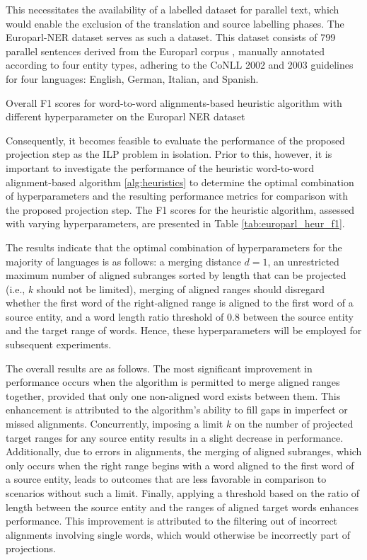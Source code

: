 This necessitates the availability of a labelled dataset for parallel text,
which would enable the exclusion of the translation and source labelling phases.
The Europarl-NER dataset \cite{agerri-etal-2018-building} serves as such a dataset.
This dataset consists of 799 parallel sentences derived from the Europarl corpus \cite{koehn2005europarl}, manually annotated according to four entity types, adhering to the CoNLL 2002 and 2003 guidelines for four languages: English, German, Italian, and Spanish.

\begin{table}[ht]
  \centering
  
  \caption{Overall F1 scores for word-to-word alignments-based heuristic
  algorithm with different hyperparameter  on the Europarl NER dataset}
  \label{tab:europarl_heur_f1}
\end{table}

Consequently, it becomes feasible to evaluate the performance of the proposed
projection step as the ILP problem in isolation. Prior to this, however, it is
important to investigate the performance of the heuristic word-to-word alignment-based
algorithm \ref{alg:heuristics} to determine the optimal combination of hyperparameters
and the resulting performance metrics for comparison with the proposed projection step.
The F1 scores for the heuristic algorithm, assessed with varying hyperparameters, are
presented in Table \ref{tab:europarl_heur_f1}.

The results indicate that the optimal combination of hyperparameters for the majority of
languages is as follows: a merging distance \( d = 1 \), an unrestricted maximum number
of aligned subranges sorted by length that can be projected (i.e., \( k \) should not be
limited), merging of aligned ranges should disregard whether the first word of the
right-aligned range is aligned to the first word of a source entity, and a word length
ratio threshold of \( 0.8 \)  between the source entity and the target range of words.
Hence, these hyperparameters will be employed for subsequent experiments.

The overall results are as follows. The most significant improvement in performance
occurs when the algorithm is permitted to merge aligned ranges together, provided
that only one non-aligned word exists between them. This enhancement is attributed to
the algorithm's ability to fill gaps in imperfect or missed alignments. Concurrently,
imposing a limit \( k \) on the number of projected target ranges for any source entity
results in a slight decrease in performance. Additionally, due to errors in alignments,
the merging of aligned subranges, which only occurs when the right range begins with a
word aligned to the first word of a source entity, leads to outcomes that are less
favorable in comparison to scenarios without such a limit. Finally, applying a threshold
based on the ratio of length between the source entity and the ranges of aligned target
words enhances performance. This improvement is attributed to the filtering out of
incorrect alignments involving single words, which would otherwise be incorrectly part of projections.

